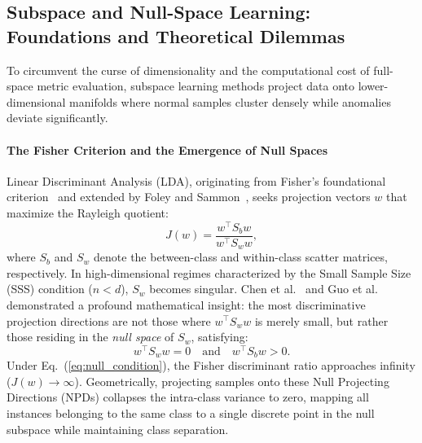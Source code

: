 \subsection{Subspace and Null-Space Learning: Foundations and Theoretical Dilemmas}
\label{subsec:rel_subspace_nullspace}

To circumvent the curse of dimensionality and the computational cost of full-space metric evaluation, subspace learning methods project data onto lower-dimensional manifolds where normal samples cluster densely while anomalies deviate significantly.

\paragraph{The Fisher Criterion and the Emergence of Null Spaces}
Linear Discriminant Analysis (LDA), originating from Fisher's foundational criterion~\cite{fisher1936use} and extended by Foley and Sammon~\cite{foley1975optimal}, seeks projection vectors $w$ that maximize the Rayleigh quotient:
\begin{equation}
J(w) = \frac{w^\top S_b w}{w^\top S_w w},
\label{eq:fisher_criterion}
\end{equation}
where $S_b$ and $S_w$ denote the between-class and within-class scatter matrices, respectively. In high-dimensional regimes characterized by the Small Sample Size (SSS) condition ($n < d$), $S_w$ becomes singular. Chen et al.~\cite{chen2000new} and Guo et al.~\cite{guo2006null} demonstrated a profound mathematical insight: the most discriminative projection directions are not those where $w^\top S_w w$ is merely small, but rather those residing in the \emph{null space} of $S_w$, satisfying:
\begin{equation}
w^\top S_w w = 0 \quad \text{and} \quad w^\top S_b w > 0.
\label{eq:null_condition}
\end{equation}
Under Eq.~(\ref{eq:null_condition}), the Fisher discriminant ratio approaches infinity ($J(w) \to \infty$). Geometrically, projecting samples onto these Null Projecting Directions (NPDs) collapses the intra-class variance to zero, mapping all instances belonging to the same class to a single discrete point in the null subspace while maintaining class separation.

